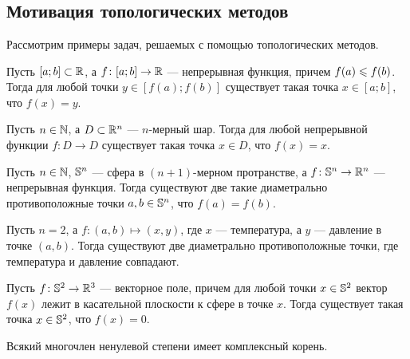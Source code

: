 \documentclass[main]{subfiles}
\begin{document}
\resetcounters

\section{}

\subsection{Мотивация топологических методов}

Рассмотрим примеры задач, решаемых с помощью топологических методов.

\begin{theorem*}
	Пусть $ [a; b] \subset \R $, а $ f \colon [a; b] \to \R $ --- непрерывная функция,
	причем $ f(a) \Le f(b) $. Тогда для любой точки $ y \in [f(a); f(b)] $ существует такая точка
	$ x \in [a; b] $, что $ f(x) = y $.
\end{theorem*}


\begin{theorem*}[Бр\'{а}уэра]
	Пусть $ n \in \N $, а $ D \subset \R^n $ --- $ n $-мерный шар. Тогда для любой
	непрерывной функции $ f \colon D \to D $ существует такая точка $ x \in D $, что $ f(x) = x $.
\end{theorem*}


\begin{theorem*}
	Пусть $ n \in \N $, $ \S^n $ --- сфера в $ (n + 1) $-мерном протранстве,
	а $ f \colon \S^n \to \R^n $ --- непрерывная функция. Тогда существуют две такие
	диаметрально противоположные точки $ a, b \in \S^n $, что $ f(a) = f(b) $.
\end{theorem*}

\begin{example}
	Пусть $ n = 2 $, а $ f \colon (a, b) \mapsto (x, y) $, где $ x $ --- температура,
	а $ y $ --- давление в точке $ (a, b) $. Тогда существуют две диаметрально противоположные точки,
	где температура и давление совпадают.
\end{example}

\begin{theorem*}
	Пусть $ f \colon \S^2 \to \R^3 $ --- векторное поле, причем для любой
	точки $ x \in \S^2 $ вектор $ f(x) $ лежит в касательной плоскости к сфере в точке $ x $.
	Тогда существует такая точка $ x \in \S^2 $, что $ f(x) = 0 $.
\end{theorem*}

\begin{theorem*}
	Всякий многочлен ненулевой степени имеет комплексный корень.
\end{theorem*}
\end{document}
